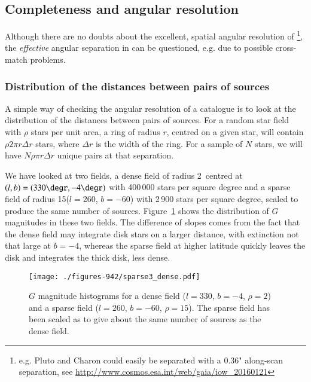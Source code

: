 \subsection{Completeness and angular resolution}

Although there are no doubts about the excellent, spatial angular resolution of  
{\gaia}\footnote{e.g. Pluto and Charon could easily be separated with a 0.36" along-scan 
separation, see {\scriptsize\url{http://www.cosmos.esa.int/web/gaia/iow_20160121}}}, the {\it effective} angular
separation in {} can be questioned, e.g. due to possible cross-match problems.

\subsubsection{Distribution of the distances between pairs of sources \label{sec:neighbours}}

A simple way of checking the angular resolution of a catalogue is to look
at the distribution of the distances between pairs of sources. For a random
star field with $\rho$ stars per unit area, a ring of radius $r$, centred on
a given star, will contain $\rho 2 \pi r \Delta r$ stars, where $\Delta r$ is
the width of the ring. For a sample of $N$ stars, we will have
$N \rho \pi r \Delta r$ unique pairs at that separation.

We have looked at two fields, a dense field of radius 2\degr\ centred at $(l,b)
= (330\degr, -4\degr)$ with 400\,000 stars per square degree and a sparse 
field of radius 15\deg ($l=260$\deg, $b=-60$\deg) with 2\,900
stars per square degree, scaled to produce the same number of sources. 
Figure~\ref{fig:942_ghist} shows the distribution of $G$ magnitudes in these two fields.
The difference of slopes comes from the fact that the dense field may integrate  
disk stars on a larger distance, with extinction not that large at $b=-4$\degr,
whereas the sparse field at higher latitude quickly leaves the disk and
integrates the thick disk, less dense. 

\begin{figure}
\centering
\texttt{[image: ./figures-942/sparse3\_dense.pdf]}
\caption{$G$ magnitude histograms for a dense field ($l=330$\deg, $b=-4$\deg, $\rho=2$\deg) 
and a sparse field ($l=260$\deg, $b=-60$\deg, $\rho=15$\deg). The sparse field has
been scaled as to give about the same number of sources as the dense field.
\label{fig:942_ghist}}
\end{figure}


